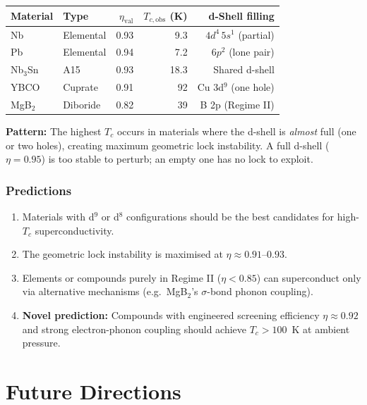 \documentclass[12pt,a4paper]{report}
\begin{document}
\begin{center}
\begin{tabular}{llrrr}
\toprule
\textbf{Material} & \textbf{Type} & $\eta_{\text{val}}$ & $T_{c,\text{obs}}$ (K) & \textbf{d-Shell filling} \\
\midrule
Nb    & Elemental & 0.93 &  9.3 & $4d^4\,5s^1$ (partial) \\
Pb    & Elemental & 0.94 &  7.2 & $6p^2$ (lone pair) \\
Nb$_3$Sn & A15  & 0.93 & 18.3 & Shared d-shell \\
YBCO  & Cuprate   & 0.91 & 92   & Cu 3d$^9$ (one hole) \\
MgB$_2$ & Diboride & 0.82 & 39 & B 2p (Regime II) \\
\bottomrule
\end{tabular}
\end{center}

\textbf{Pattern:} The highest $T_c$ occurs in materials where the d-shell is \emph{almost} full (one or two holes), creating maximum geometric lock instability. A full d-shell ($\eta = 0.95$) is too stable to perturb; an empty one has no lock to exploit.

\subsection{Predictions}

\begin{enumerate}
  \item Materials with d$^9$ or d$^8$ configurations should be the best candidates for high-$T_c$ superconductivity.
  \item The geometric lock instability is maximised at $\eta \approx 0.91$--$0.93$.
  \item Elements or compounds purely in Regime II ($\eta < 0.85$) can superconduct only via alternative mechanisms (e.g.\ MgB$_2$'s $\sigma$-bond phonon coupling).
  \item \textbf{Novel prediction:} Compounds with engineered screening efficiency $\eta \approx 0.92$ and strong electron-phonon coupling should achieve $T_c > 100$~K at ambient pressure.
\end{enumerate}


\chapter{Future Directions}
\label{ch:future}
\end{document}
